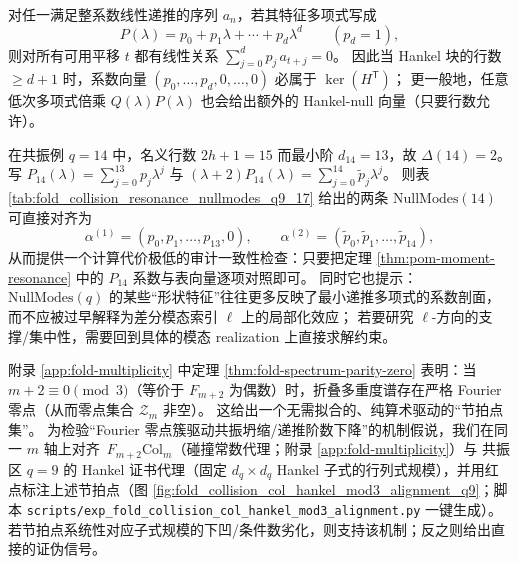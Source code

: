 \begin{remark}[Hankel-null 与特征多项式的对齐：以 \texorpdfstring{$q=14$}{q=14} 为例]\label{rem:pom-nullmodes-q14-poly-alignment}
对任一满足整系数线性递推的序列 \(a_n\)，若其特征多项式写成
\[
P(\lambda)=p_0+p_1\lambda+\cdots+p_d\lambda^d\qquad(p_d=1),
\]
则对所有可用平移 \(t\) 都有线性关系
\(
\sum_{j=0}^{d} p_j\,a_{t+j}=0
\)。
因此当 Hankel 块的行数 \(\ge d+1\) 时，系数向量 \((p_0,\dots,p_d,0,\dots,0)\) 必属于 \(\ker(H^{\mathsf T})\)；
更一般地，任意低次多项式倍乘 \(Q(\lambda)P(\lambda)\) 也会给出额外的 Hankel-null 向量（只要行数允许）。
\par
在共振例 \(q=14\) 中，名义行数 \(2h+1=15\) 而最小阶 \(d_{14}=13\)，故 \(\Delta(14)=2\)。
写
\(
P_{14}(\lambda)=\sum_{j=0}^{13}p_j\lambda^j
\)
与
\(
(\lambda+2)P_{14}(\lambda)=\sum_{j=0}^{14}\widetilde p_j\lambda^j
\)。
则表 \ref{tab:fold_collision_resonance_nullmodes_q9_17} 给出的两条 \(\mathrm{NullModes}(14)\) 可直接对齐为
\[
\alpha^{(1)}=(p_0,p_1,\ldots,p_{13},0),
\qquad
\alpha^{(2)}=(\widetilde p_0,\widetilde p_1,\ldots,\widetilde p_{14}),
\]
从而提供一个计算代价极低的审计一致性检查：只要把定理 \ref{thm:pom-moment-resonance} 中的 \(P_{14}\) 系数与表向量逐项对照即可。
同时它也提示：\(\mathrm{NullModes}(q)\) 的某些“形状特征”往往更多反映了最小递推多项式的系数剖面，而不应被过早解释为差分模态索引 \(\ell\) 上的局部化效应；
若要研究 \(\ell\)-方向的支撑/集中性，需要回到具体的模态 realization 上直接求解约束。
\end{remark}

\begin{remark}[算术节拍标注：\texorpdfstring{$m+2\equiv 0\pmod 3$}{m+2=0 mod 3} 点与 Hankel 证书对齐（可证伪）]\label{rem:pom-mod3-beat-alignment}
附录 \ref{app:fold-multiplicity} 中定理 \ref{thm:fold-spectrum-parity-zero} 表明：当 \(m+2\equiv 0\pmod 3\)（等价于 \(F_{m+2}\) 为偶数）时，折叠多重度谱存在严格 Fourier 零点（从而零点集合 \(\mathcal{Z}_m\) 非空）。
这给出一个无需拟合的、纯算术驱动的“节拍点集”。
为检验“Fourier 零点簇驱动共振坍缩/递推阶数下降”的机制假说，我们在同一 \(m\) 轴上对齐
\(\,F_{m+2}\mathrm{Col}_m\)（碰撞常数代理；附录 \ref{app:fold-multiplicity}）与
共振区 \(q=9\) 的 Hankel 证书代理（固定 \(d_q\times d_q\) Hankel 子式的行列式规模），并用红点标注上述节拍点（图 \ref{fig:fold_collision_col_hankel_mod3_alignment_q9}；脚本 \texttt{scripts/exp\_fold\_collision\_col\_hankel\_mod3\_alignment.py} 一键生成）。
若节拍点系统性对应子式规模的下凹/条件数劣化，则支持该机制；反之则给出直接的证伪信号。
\end{remark}



